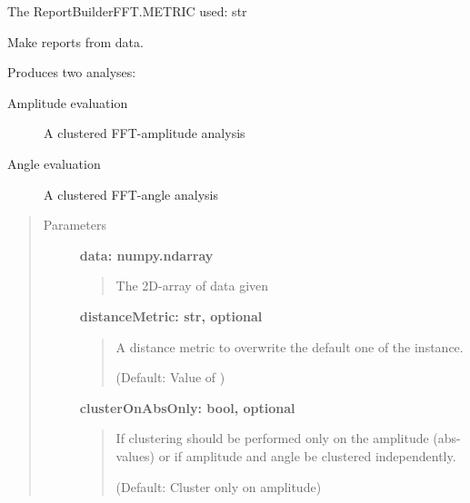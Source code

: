 \documentclass[letterpaper,10pt,english]{sphinxmanual}
\begin{document}
\begin{fulllineitems}

\begin{fulllineitems}
\label{fseq.reporting:fseq.reporting.report_builder.ReportBuilderFFT.distanceMetric}
The ReportBuilderFFT.METRIC used: str

\end{fulllineitems}


\begin{fulllineitems}
\label{fseq.reporting:fseq.reporting.report_builder.ReportBuilderFFT.distill}
Make reports from data.

Produces two analyses:
\begin{description}
\item[{Amplitude evaluation}] \leavevmode
A clustered FFT-amplitude analysis

\item[{Angle evaluation}] \leavevmode
A clustered FFT-angle analysis

\end{description}
\begin{quote}\begin{description}
\item[{Parameters}] \leavevmode
\textbf{data: numpy.ndarray}
\begin{quote}

The 2D-array of data given
\end{quote}

\textbf{distanceMetric: str, optional}
\begin{quote}

A distance metric to overwrite the default one of the instance.

(Default: Value of )
\end{quote}

\textbf{clusterOnAbsOnly: bool, optional}
\begin{quote}

If clustering should be performed only on the amplitude (abs-values)
or if amplitude and angle be clustered independently.

(Default: Cluster only on amplitude)
\end{quote}


\end{description}
\end{quote}
\end{fulllineitems}
\end{fulllineitems}
\end{document}
